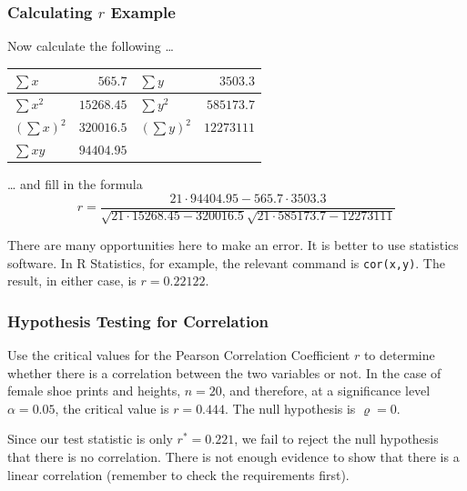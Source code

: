 \documentclass[xcolor=dvipsnames]{beamer}
\begin{document}
\begin{frame}
  \frametitle{Calculating $r$ Example}
  Now calculate the following {\ldots}

  \bigskip
  
  \begin{tabular}{|l|r|l|r|}\hline
    $\sum{}x$ & $565.7$ & $\sum{}y$ & $3503.3$ \\ \hline
    $\sum{}x^{2}$ & $15268.45$ & $\sum{}y^{2}$ & $585173.7$ \\ \hline
    $\left(\sum{}x\right)^{2}$ & $320016.5$ & $\left(\sum{}y\right)^{2}$ & $12273111$ \\ \hline
    $\sum{}xy$ & $94404.95$ & & \\ \hline
  \end{tabular}

  \bigskip
  
  {\ldots} and fill in the formula
  \begin{equation}
    \label{eq:igahgued}
    r=\frac{21\cdot94404.95-565.7\cdot{}3503.3}{\sqrt{21\cdot{}15268.45-320016.5}\sqrt{21\cdot{}585173.7-12273111}}
  \end{equation}

\bigskip

There are many opportunities here to make an error. It is better
to use statistics software. In R Statistics, for example, the
relevant command is \texttt{cor(x,y)}. The result, in either case,
is $r=0.22122$.
\end{frame}

\begin{frame}
  \frametitle{Hypothesis Testing for Correlation}
  Use the critical values for the Pearson Correlation Coefficient
  $r$ to determine whether there is a correlation between the two
  variables or not. In the case of female shoe prints and heights,
  $n=20$, and therefore, at a significance level $\alpha=0.05$,
  the critical value is $r=0.444$. The null hypothesis is
  $\varrho=0$.

  \bigskip

Since our test statistic is
  only $r^{\ast}=0.221$, we fail to reject the null hypothesis
  that there is no correlation. There is not enough evidence to
  show that there is a linear correlation (remember to check the
  requirements first).
\end{frame}
\end{document}
